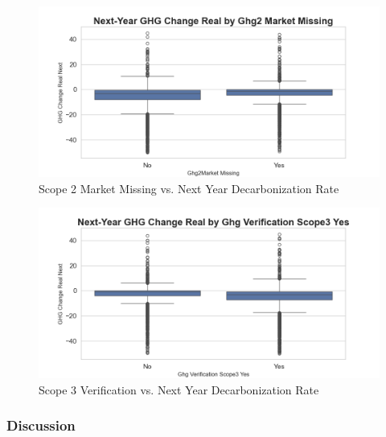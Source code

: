 \begin{figure}[H]
\centering
  \includegraphics[width=\textwidth]{figures/ghg_change_real_next_by_ghg2market_na.png}
\caption{Scope 2 Market Missing vs. Next Year Decarbonization Rate}
\label{fig:ghg_change_real_next_by_ghg2market_na}
\end{figure}

\begin{figure}[H]
\centering
  \includegraphics[width=\textwidth]{figures/ghg_change_real_next_by_ghg_verification_scope3_yes.png}
\caption{Scope 3 Verification vs. Next Year Decarbonization Rate}
\label{fig:ghg_change_real_next_by_ghg_verification_scope3_yes}
\end{figure}


\subsubsection{Discussion}

